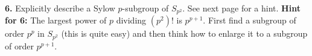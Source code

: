 \documentclass[12pt]{amsart}
\begin{document}
{\bf 6.} Explicitly describe a Sylow $p$-subgroup of $S_{p^2}$. See next page for a hint.
\newpage
{\bf Hint for 6:} The largest power of $p$ dividing $(p^2)!$ is $p^{p+1}$. First find a subgroup of order $p^p$
in $S_{p^2}$ (this is quite easy) and then think how to enlarge it to a subgroup of order $p^{p+1}$.
\end{document}
